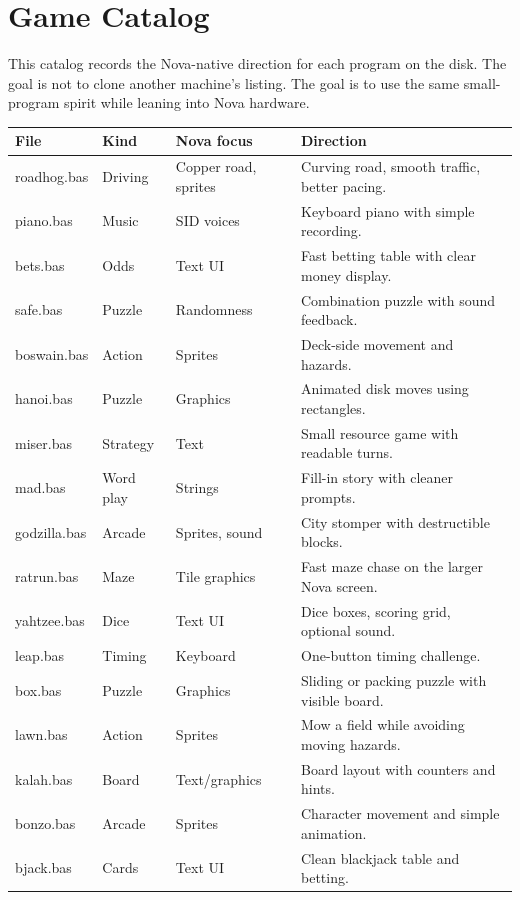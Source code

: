 \chapter{Game Catalog}

This catalog records the Nova-native direction for each program on the disk.
The goal is not to clone another machine's listing. The goal is to use the same
small-program spirit while leaning into Nova hardware.

\begin{longtable}{>{\ttfamily}p{}p{}p{}p{}}
\toprule
File & Kind & Nova focus & Direction\\
\midrule
\endhead
roadhog.bas & Driving & Copper road, sprites & Curving road, smooth traffic, better pacing.\\
piano.bas & Music & SID voices & Keyboard piano with simple recording.\\
bets.bas & Odds & Text UI & Fast betting table with clear money display.\\
safe.bas & Puzzle & Randomness & Combination puzzle with sound feedback.\\
boswain.bas & Action & Sprites & Deck-side movement and hazards.\\
hanoi.bas & Puzzle & Graphics & Animated disk moves using rectangles.\\
miser.bas & Strategy & Text & Small resource game with readable turns.\\
mad.bas & Word play & Strings & Fill-in story with cleaner prompts.\\
godzilla.bas & Arcade & Sprites, sound & City stomper with destructible blocks.\\
ratrun.bas & Maze & Tile graphics & Fast maze chase on the larger Nova screen.\\
yahtzee.bas & Dice & Text UI & Dice boxes, scoring grid, optional sound.\\
leap.bas & Timing & Keyboard & One-button timing challenge.\\
box.bas & Puzzle & Graphics & Sliding or packing puzzle with visible board.\\
lawn.bas & Action & Sprites & Mow a field while avoiding moving hazards.\\
kalah.bas & Board & Text/graphics & Board layout with counters and hints.\\
bonzo.bas & Arcade & Sprites & Character movement and simple animation.\\
bjack.bas & Cards & Text UI & Clean blackjack table and betting.\\

\end{longtable}
